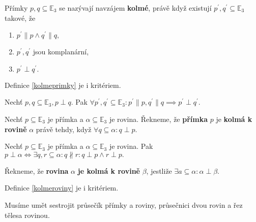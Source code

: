 \begin{definition}\label{kolmeprimky}
    Přímky $p,q \subseteq \mathbb E_3$ se nazývají navzájem \textbf{kolmé}, právě když
    existují $p^\prime, q^\prime \subseteq \mathbb E_3$ takové, že
    \begin{enumerate}[$i.$]
    \item   $p^\prime \parallel p \land q^\prime \parallel q,$
   	\item $p^\prime, q^\prime$ jsou komplanární,
   	\item $p^\prime \perp q^\prime.$
    \end{enumerate}
\end{definition}

\begin{pozn}
    Definice \ref{kolmeprimky} je i kritériem.
\end{pozn}

\begin{veta}
    Nechť $p,q \subseteq \mathbb E_3, p\perp q.$ Pak $\forall p^\prime, q^\prime
    \subseteq \mathbb E_3: p^\prime \parallel p, q^\prime \parallel q \implies
    p^\prime \perp q^\prime.$
\end{veta}

\begin{definition}
    Nechť $p\subseteq \mathbb E_3$ je přímka a $\alpha \subseteq \mathbb E_3$ je rovina.
    Řekneme, že \textbf{přímka} $p$ je \textbf{kolmá k rovině} $\alpha$ právě tehdy,
    když $\forall q \subseteq \alpha: q \perp p.$
\end{definition}

\begin{veta}
    Nechť $p\subseteq \mathbb E_3$ je přímka a $\alpha \subseteq \mathbb E_3$ je rovina.
    Pak  $p\perp \alpha \iff \exists q,r \subseteq \alpha: q \nparallel r: q\perp p\land
    r\perp p.$
\end{veta}

\begin{definition}\label{kolmeroviny}
    Řekneme, že \textbf{rovina} $\alpha$ \textbf{je kolmá k rovině} $\beta$, jestliže
    $\exists a\subseteq\alpha: \alpha \perp\beta.$
\end{definition}

\begin{pozn}
    Definice \ref{kolmeroviny} je i kritériem.
\end{pozn}

\begin{pozn}
    Musíme umět sestrojit průsečík přímky a roviny, průsečnici dvou rovin a řez
    tělesa rovinou.
\end{pozn}

